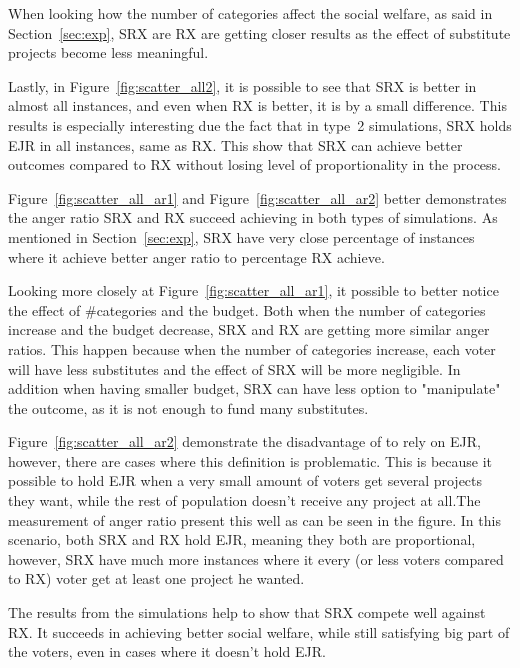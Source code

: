 \documentclass[runningheads]{llncs}
\begin{document}
\begin{subappendices}
When looking how the number of categories affect the social welfare, as said in Section~\ref{sec:exp}, SRX are RX are getting closer results as the effect of substitute projects become less meaningful.

Lastly, in Figure~\ref{fig:scatter_all2}, it is possible to see that SRX is better in almost all instances, and even when RX is better, it is by a small difference. This results is especially interesting due the fact that in type~2 simulations, SRX holds EJR in all instances, same as RX. This show that SRX can achieve better outcomes compared to RX without losing level of proportionality in the process.

Figure~\ref{fig:scatter_all_ar1} and Figure~\ref{fig:scatter_all_ar2} better demonstrates the anger ratio SRX and RX succeed achieving in both types of simulations. As mentioned in Section~\ref{sec:exp}, SRX have very close percentage of instances where it achieve better anger ratio to percentage RX achieve.

Looking more closely at Figure~\ref{fig:scatter_all_ar1}, it possible to better notice the effect of \#categories and the budget. Both when the number of categories increase and the budget decrease, SRX and RX are getting more similar anger ratios. This happen because when the number of categories increase, each voter will have less substitutes and the effect of SRX will be more negligible. In addition when having smaller budget, SRX can have less option to "manipulate" the outcome, as it is not enough to fund many substitutes.

Figure~\ref{fig:scatter_all_ar2} demonstrate the disadvantage of to rely on EJR, however, there are cases where this definition is problematic. This is because it possible to hold EJR when a very small amount of voters get several projects they want, while the rest of population doesn't receive any project at all.The measurement of anger ratio present this well as can be seen in the figure. In this scenario, both SRX and RX hold EJR, meaning they both are proportional, however, SRX have much more instances where it every (or less voters compared to RX) voter get at least one project he wanted.

The results from the simulations help to show that SRX compete well against RX. It succeeds in achieving better social welfare, while still satisfying big part of the voters, even in cases where it doesn't hold EJR.



\end{subappendices}
\end{document}
